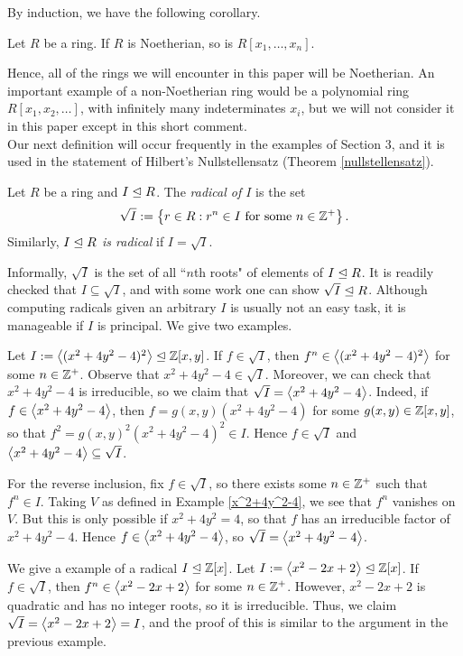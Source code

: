 \documentclass{article}
\begin{document}
By induction, we have the following corollary.
\begin{corollary}\label{noetheriancorollary}
Let $R$ be a ring. If $R$ is Noetherian, so is $R[x_1, \ldots, x_n]$.
\end{corollary}

Hence, all of the rings we will encounter in this paper will be Noetherian. An important example of a non-Noetherian ring would be a polynomial ring $R[x_1, x_2, \ldots]$, with infinitely many indeterminates $x_i$, but we will not consider it in this paper except in this short comment.
\\

Our next definition will occur frequently in the examples of Section 3, and it is used in the statement of Hilbert's Nullstellensatz (Theorem \ref{nullstellensatz}).
\begin{definition}\label{radical}
Let $R$ be a ring and $I\trianglelefteq R$. The \textit{radical of $I$} is the set
$$\sqrt{I} := \left\{r\in R: r^n \in I \textrm{ for some } n\in \mathbb Z^+\right\}.$$
Similarly, $I\trianglelefteq R$ \textit{is radical} if $I = \sqrt I$.
\end{definition}
Informally, $\sqrt I$ is the set of all ``$n$th roots" of elements of $I\trianglelefteq R$. It is readily checked that $I\subseteq \sqrt I$, and with some work one can show $\sqrt I\trianglelefteq R$. Although computing radicals given an arbitrary $I$ is usually not an easy task, it is manageable if $I$ is principal. We give two examples.

\begin{example}\label{radcomputation}
Let $I := \left\langle(x^2+4y^2-4)^2\right\rangle\trianglelefteq \mathbb Z[x,y]$. If $f\in \sqrt I$, then $f^n \in \left\langle(x^2+4y^2-4)^2\right\rangle$ for some $n\in\mathbb Z^+$. Observe that $x^2+4y^2-4\in \sqrt I$. Moreover, we can check that $x^2+4y^2-4$ is irreducible, so we claim that ${\sqrt I = \left\langle x^2+4y^2-4\right\rangle}$. Indeed, if $f\in \left\langle x^2+4y^2-4\right\rangle$, then $f = g(x,y)(x^2+4y^2-4)$ for some $g(x,y)\in\mathbb Z[x,y]$, so that $f^2 = g(x,y)^2(x^2+4y^2-4)^{2} \in I$. Hence $f\in \sqrt I$ and $\left\langle x^2+4y^2-4\right\rangle\subseteq \sqrt I$.

For the reverse inclusion, fix $f\in\sqrt I$, so there exists some $n\in\mathbb Z^+$ such that $f^n\in I$. Taking $V$ as defined in Example \ref{x^2+4y^2-4}, we see that $f^n$ vanishes on $V$. But this is only possible if $x^2 + 4y^2 = 4$, so that $f$ has an irreducible factor of $x^2+4y^2-4$. Hence $f\in \left\langle x^2+4y^2-4\right\rangle$, so $\sqrt I = \left\langle x^2+4y^2 - 4\right\rangle$.
\end{example}

\begin{example}
We give a example of a radical $I\trianglelefteq \mathbb Z[x]$. Let $I := \left\langle x^2 - 2x+2\right\rangle\trianglelefteq \mathbb Z[x]$. If $f\in\sqrt I$, then $f^n\in \left\langle x^2-2x+2\right\rangle$ for some $n\in\mathbb Z^+$. However, $x^2-2x+2$ is quadratic and has no integer roots, so it is irreducible. Thus, we claim $\sqrt I = \left\langle x^2 - 2x+2\right\rangle = I$, and the proof of this is similar to the argument in the previous example.
\end{example}
\end{document}
